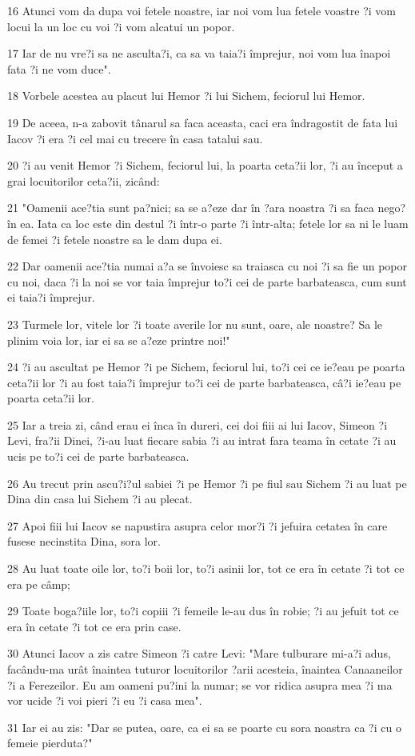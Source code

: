 \par 16 Atunci vom da dupa voi fetele noastre, iar noi vom lua fetele voastre ?i vom locui la un loc cu voi ?i vom alcatui un popor.
\par 17 Iar de nu vre?i sa ne asculta?i, ca sa va taia?i împrejur, noi vom lua înapoi fata ?i ne vom duce".
\par 18 Vorbele acestea au placut lui Hemor ?i lui Sichem, feciorul lui Hemor.
\par 19 De aceea, n-a zabovit tânarul sa faca aceasta, caci era îndragostit de fata lui Iacov ?i era ?i cel mai cu trecere în casa tatalui sau.
\par 20 ?i au venit Hemor ?i Sichem, feciorul lui, la poarta ceta?ii lor, ?i au început a grai locuitorilor ceta?ii, zicând:
\par 21 "Oamenii ace?tia sunt pa?nici; sa se a?eze dar în ?ara noastra ?i sa faca nego? în ea. Iata ca loc este din destul ?i într-o parte ?i într-alta; fetele lor sa ni le luam de femei ?i fetele noastre sa le dam dupa ei.
\par 22 Dar oamenii ace?tia numai a?a se învoiesc sa traiasca cu noi ?i sa fie un popor cu noi, daca ?i la noi se vor taia împrejur to?i cei de parte barbateasca, cum sunt ei taia?i împrejur.
\par 23 Turmele lor, vitele lor ?i toate averile lor nu sunt, oare, ale noastre? Sa le plinim voia lor, iar ei sa se a?eze printre noi!"
\par 24 ?i au ascultat pe Hemor ?i pe Sichem, feciorul lui, to?i cei ce ie?eau pe poarta ceta?ii lor ?i au fost taia?i împrejur to?i cei de parte barbateasca, câ?i ie?eau pe poarta ceta?ii lor.
\par 25 Iar a treia zi, când erau ei înca în dureri, cei doi fiii ai lui Iacov, Simeon ?i Levi, fra?ii Dinei, ?i-au luat fiecare sabia ?i au intrat fara teama în cetate ?i au ucis pe to?i cei de parte barbateasca.
\par 26 Au trecut prin ascu?i?ul sabiei ?i pe Hemor ?i pe fiul sau Sichem ?i au luat pe Dina din casa lui Sichem ?i au plecat.
\par 27 Apoi fiii lui Iacov se napustira asupra celor mor?i ?i jefuira cetatea în care fusese necinstita Dina, sora lor.
\par 28 Au luat toate oile lor, to?i boii lor, to?i asinii lor, tot ce era în cetate ?i tot ce era pe câmp;
\par 29 Toate boga?iile lor, to?i copiii ?i femeile le-au dus în robie; ?i au jefuit tot ce era în cetate ?i tot ce era prin case.
\par 30 Atunci Iacov a zis catre Simeon ?i catre Levi: "Mare tulburare mi-a?i adus, facându-ma urât înaintea tuturor locuitorilor ?arii acesteia, înaintea Canaaneilor ?i a Ferezeilor. Eu am oameni pu?ini la numar; se vor ridica asupra mea ?i ma vor ucide ?i voi pieri ?i eu ?i casa mea".
\par 31 Iar ei au zis: "Dar se putea, oare, ca ei sa se poarte cu sora noastra ca ?i cu o femeie pierduta?"

